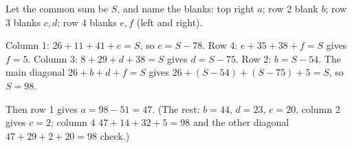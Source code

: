 Let the common sum be $S$, and name the blanks: top right $a$; row 2 blank $b$; row 3 blanks $c,d$; row 4 blanks $e,f$ (left and right).

Column 1: $26+11+41+e=S$, so $e=S-78$. Row 4: $e+35+38+f=S$ gives $f=5$. Column 3: $8+29+d+38=S$ gives $d=S-75$. Row 2: $b=S-54$. The main diagonal $26+b+d+f=S$ gives $26+(S-54)+(S-75)+5=S$, so $S=98$.

Then row 1 gives $a=98-51=\boxed{47}$. (The rest: $b=44$, $d=23$, $e=20$, column 2 gives $c=2$; column 4 $47+14+32+5=98$ and the other diagonal $47+29+2+20=98$ check.)
